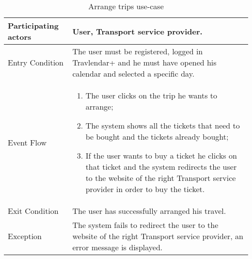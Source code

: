 \begin{table}[H]
	\begin{center}
		\begin{tabular}{ | p{} | p{} | }
		\hline
		Participating actors &  User, Transport service provider.\\
		\hline
		Entry Condition & The user must be registered, logged in Travlendar+ and he must have opened his calendar and selected a specific day.\\
		\hline
		Event Flow & 
			\begin{enumerate}
				\item The user clicks on the trip he wants to arrange;
				\item The system shows all the tickets that need to be bought and the tickets already bought;
				\item If the user wants to buy a ticket he clicks on that ticket and the system redirects the user to the website of the right Transport service provider in order to buy the ticket.
			\end{enumerate} \\
		\hline
		Exit Condition & The user has successfully arranged his travel. \\
		\hline
		Exception & The system fails to redirect the user to the website of the right Transport service provider, an error message is displayed.\\ 
		\hline
		\end{tabular}
	\end{center}
	\caption{Arrange trips use-case}
\end{table}